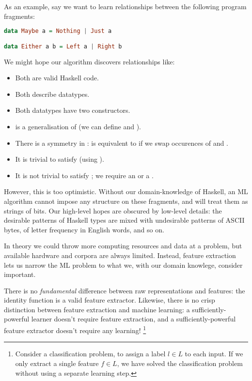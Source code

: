 As an example, say we want to learn relationships between the following program
fragments:

\begin{lstlisting}[language=Haskell, xleftmargin=.2\textwidth, xrightmargin=.2\textwidth]
data Maybe a = Nothing | Just a

data Either a b = Left a | Right b
\end{lstlisting}

We might hope our algorithm discovers relationships like:

\begin{itemize}
  \item Both are valid Haskell code.
  \item Both describe datatypes.
  \item Both datatypes have two constructors.
  \item {} is a generalisation of  (we can define  and ).
  \item There is a symmetry in :  is equivalent to
     if we swap occurences of  and .
  \item It is trivial to satisfy  (using ).
  \item It is not trivial to satisfy ; we require an  or a .
\end{itemize}

However, this is too optimistic. Without our domain-knowledge of Haskell, an ML
algorithm cannot impose any structure on these fragments, and will treat them as
strings of bits. Our high-level hopes are obscured by low-level details: the
desirable patterns of Haskell types are mixed with undesirable patterns of ASCII
bytes, of letter frequency in English words, and so on.

In theory we could throw more computing resources and data at a problem, but
available hardware and corpora are always limited. Instead, feature extraction
lets us narrow the ML problem to what we, with our domain knowlege, consider
important.

There is no \emph{fundamental} difference between raw representations and
features: the identity function is a valid feature extractor. Likewise, there is
no crisp distinction between feature extraction and machine learning: a
sufficiently-powerful learner doesn't require feature extraction, and a
sufficiently-powerful feature extractor doesn't require any learning!
\footnote{Consider a classification problem, to assign a label $l \in L$ to each
  input. If we only extract a single feature $f \in L$, we have solved the
  classification problem without using a separate learning step.}

